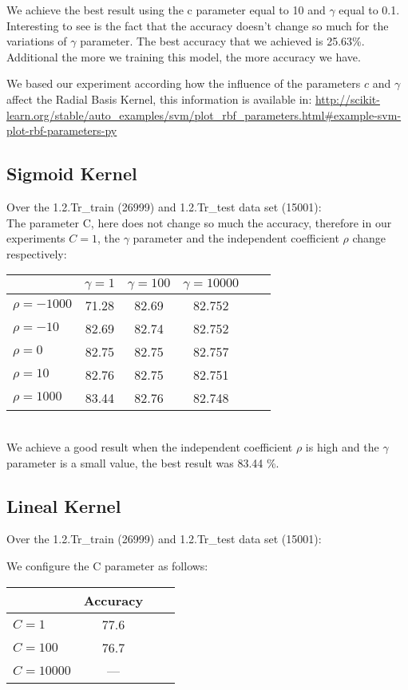 \documentclass[11pt,a4paper]{article}
\begin{document}
We achieve the best result using the c parameter equal to 10 and $\gamma$ equal to 0.1. Interesting to see is the fact that the accuracy doesn't change so much for the variations of $\gamma$ parameter. The best accuracy that we achieved is 25.63\%. Additional the more we training this model, the more accuracy we have. 

We based our experiment according how the influence of the parameters $c$ and $\gamma$ affect the Radial Basis Kernel, this information is available in: \url{http://scikit-learn.org/stable/auto_examples/svm/plot_rbf_parameters.html#example-svm-plot-rbf-parameters-py}

\subsection{Sigmoid Kernel}

Over the  1.2.Tr\_train (26999) and  1.2.Tr\_test data set (15001): \\
The parameter C, here does not change so much the accuracy, therefore in our experiments $C=1$, the $\gamma$ parameter and the independent coefficient $\rho$ change respectively:   

\begin{tabular}{l*{4}{c}r}
	& $\gamma = 1$ & $\gamma = 100$ & $\gamma = 10000$ \\
\hline
$\rho = -1000$	&	71.28	& 	82.69	&	82.752 \\ 
$\rho = -10$	&	82.69	&	82.74	&	82.752 \\
$\rho = 0$  	&	82.75	&	82.75	&	82.757 \\
$\rho = 10$  	&	82.76	&	82.75	&	82.751 \\
$\rho = 1000$  	&	83.44	&	82.76	&	82.748 \\
\end{tabular} \\

We achieve a good result when the independent coefficient $\rho$ is high and the $\gamma$ parameter is a small value, the best result was 83.44 \%.  

\subsection{Lineal Kernel}

Over the  1.2.Tr\_train (26999) and  1.2.Tr\_test data set (15001):

We configure the C parameter as follows:

\begin{tabular}{l*{2}{c}r}
	& Accuracy   \\
\hline
$C = 1$	&	77.6	 \\ 
$C = 100$	&	76.7 \\
$C = 10000$	&	--- \\
\end{tabular} \\
\end{document}
